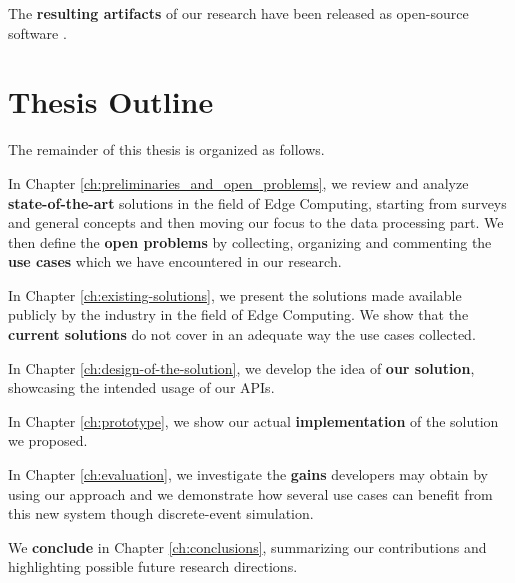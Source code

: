 The \textbf{resulting artifacts} of our research have been released as open-source software \cite{thesis-github}.


\section{Thesis Outline}
The remainder of this thesis is organized as follows.

In Chapter \ref{ch:preliminaries_and_open_problems}, we review and analyze \textbf{state-of-the-art} solutions in the field of Edge Computing, starting from surveys and general concepts and then moving our focus to the data processing part. We then define the \textbf{open problems} by collecting, organizing and commenting the \textbf{use cases} which we have encountered in our research.

In Chapter \ref{ch:existing-solutions}, we present the solutions made available publicly by the industry in the field of Edge Computing. We show that the \textbf{current solutions} do not cover in an adequate way the use cases collected.

In Chapter \ref{ch:design-of-the-solution}, we develop the idea of \textbf{our solution}, showcasing the intended usage of our APIs.

In Chapter \ref{ch:prototype}, we show our actual \textbf{implementation} of the solution we proposed.

In Chapter \ref{ch:evaluation}, we investigate the \textbf{gains} developers may obtain by using our approach and we demonstrate how several use cases can benefit from this new system though discrete-event simulation.

We \textbf{conclude} in Chapter \ref{ch:conclusions}, summarizing our contributions and highlighting possible future research directions.

